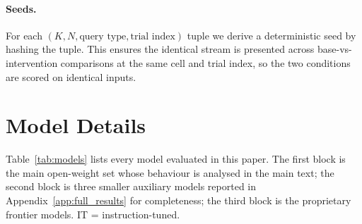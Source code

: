 \documentclass[letterpaper]{article} %
\begin{document}
\paragraph{Seeds.}
For each $(K, N, \text{query type}, \text{trial index})$ tuple we
derive a deterministic seed by hashing the tuple. This ensures the
identical stream is presented across base-vs-intervention
comparisons at the same cell and trial index, so the two conditions
are scored on identical inputs.

\section{Model Details}
\label{app:models}

Table~\ref{tab:models} lists every model evaluated in this paper.
The first block is the main open-weight set whose behaviour is
analysed in the main text; the second block is three smaller
auxiliary models reported in Appendix~\ref{app:full_results} for
completeness; the third block is the proprietary frontier models.
IT = instruction-tuned.
\end{document}

